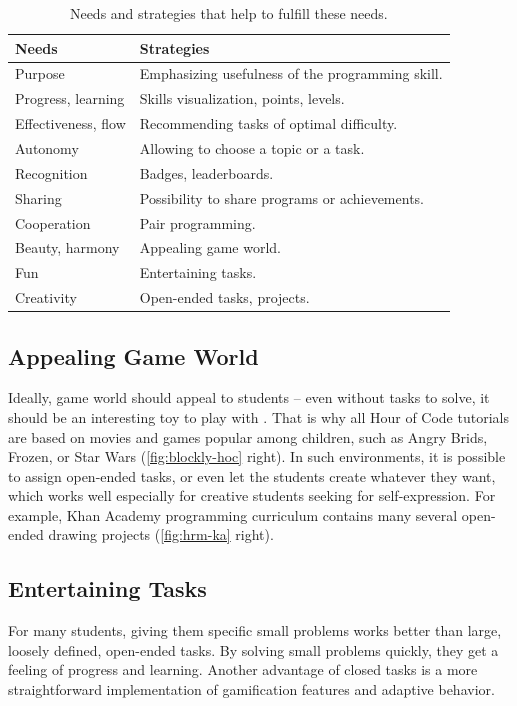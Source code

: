 \begin{table}[htb]
\centering
\begin{tabular}{ll}
\toprule
Needs & Strategies \\
\midrule
Purpose & Emphasizing usefulness of the programming skill. \\ %
Progress, learning & Skills visualization, points, levels. \\
Effectiveness, flow & Recommending tasks of optimal difficulty. \\ %
Autonomy & Allowing to choose a topic or a task. \\
Recognition & Badges, leaderboards. \\  %
Sharing & Possibility to share programs or achievements. \\
Cooperation & Pair programming. \\
Beauty, harmony & Appealing game world. \\ %
Fun & Entertaining tasks. \\
Creativity & Open-ended tasks, projects. \\  %
\bottomrule
\end{tabular}
\caption{Needs and strategies that help to fulfill these needs.}
\label{tbl:motivation-strategies}
\end{table}



\subsection{Appealing Game World}
\label{sec:motivation.game-world}
Ideally, game world should appeal to students --
even without tasks to solve,
  it should be an interesting toy to play with \cite{book-of-lenses}.
That is why all Hour of Code tutorials are based on movies and games
  popular among children, such as Angry Brids, Frozen, or Star Wars
  (\cref{fig:blockly-hoc} right).
In such environments, it is possible to assign open-ended tasks,
  or even let the students create whatever they want,
  which works well especially for creative students seeking for self-expression.
For example, Khan Academy programming curriculum contains many several
open-ended drawing projects (\cref{fig:hrm-ka} right).

\subsection{Entertaining Tasks}
\label{sec:motivation.tasks}
For many students, giving them specific small problems works better
  than large, loosely defined, open-ended tasks.
By solving small problems quickly,
  they get a feeling of progress and learning.
Another advantage of closed tasks
  is a more straightforward implementation of gamification features and adaptive behavior.

